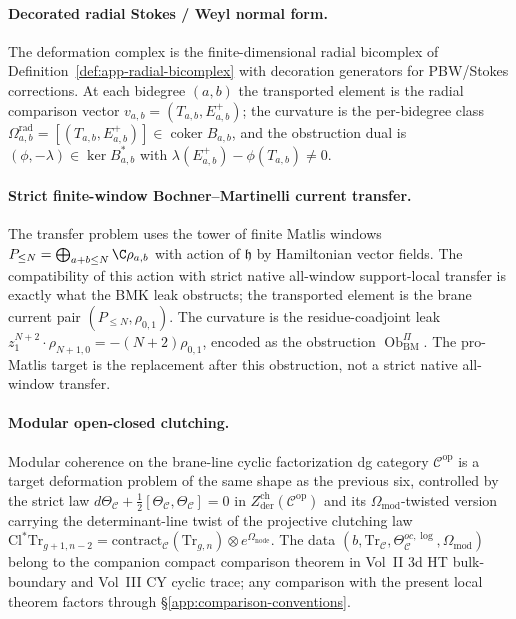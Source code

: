 \paragraph{Decorated radial Stokes / Weyl normal form.}  The
deformation complex is the finite-dimensional radial bicomplex of
Definition~\ref{def:app-radial-bicomplex} with decoration generators
for PBW/Stokes corrections.  At each bidegree \((a,b)\) the transported
element is the radial comparison vector
\(v_{a,b}=(T_{a,b},E^+_{a,b})\); the curvature is the per-bidegree class
\(\Omega^{\mathrm{rad}}_{a,b}=[(T_{a,b},E^+_{a,b})]\in
\operatorname{coker}B_{a,b}\), and the obstruction dual is
\((\phi,-\lambda)\in\ker B^*_{a,b}\) with
\(\lambda(E^+_{a,b})-\phi(T_{a,b})\ne0\).

\paragraph{Strict finite-window Bochner--Martinelli current transfer.}
The transfer problem uses the tower of finite Matlis windows
\(P_{\le N}=\bigoplus_{a+b\le N}\C\rho_{a,b}\) with action of
\(\mathfrak h\) by Hamiltonian vector fields.  The compatibility of this
action with strict native all-window support-local transfer is exactly
what the BMK leak obstructs; the transported element
is the brane current pair
\((P_{\le N},\rho_{0,1})\).  The curvature is the residue-coadjoint
leak \(z_1^{N+2}\cdot\rho_{N+1,0}=-(N+2)\rho_{0,1}\), encoded as the
obstruction \(\operatorname{Ob}^{\Pi}_{\mathrm{BM}}\).  The pro-Matlis
target is the replacement after this obstruction, not a strict native
all-window transfer.

\paragraph{Modular open-closed clutching.}  Modular coherence on the
brane-line cyclic factorization dg category \(\mathcal C^{\mathrm{op}}\)
is a target deformation problem of the same shape as the previous six,
controlled by the strict law
\(d\Theta_{\mathcal C}+\tfrac12[\Theta_{\mathcal C},\Theta_{\mathcal C}]=0\)
in \(Z^{\mathrm{ch}}_{\mathrm{der}}(\mathcal C^{\mathrm{op}})\) and its
\(\Omega_{\mathrm{mod}}\)-twisted version carrying the determinant-line
twist of the projective clutching law
\(\mathrm{Cl}^*\mathrm{Tr}_{g+1,n-2}
=\mathrm{contract}_{\mathcal C}(\mathrm{Tr}_{g,n})\otimes e^{\Omega_{\mathrm{node}}}\).
The data \((b,\mathrm{Tr}_{\mathcal C},\Theta_{\mathcal C}^{oc,\log},
\Omega_{\mathrm{mod}})\) belong to the companion compact comparison
theorem in Vol~II 3d HT bulk-boundary and Vol~III CY cyclic trace; any
comparison with the present local theorem factors through
\S\ref{app:comparison-conventions}.

